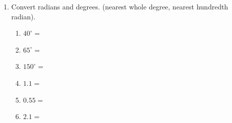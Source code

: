 \begin{enumerate}
\item Convert radians and degrees. (nearest whole degree, nearest hundredth radian).\vspace{.25cm}
  \begin{multicols}{2}
    \begin{enumerate}
      \item $40^\circ = $ \vspace{1cm}
      \item $65^\circ = $ \vspace{1cm}
      \item $150^\circ = $
      \item $\displaystyle 1.1 =$ \vspace{1cm}
      \item $\displaystyle 0.55 =$ \vspace{1cm}
      \item $\displaystyle 2.1 =$
    \end{enumerate}
  \end{multicols} \vspace{1cm}


\end{enumerate}
